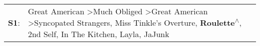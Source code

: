 \begin{supertabular}{p{0.03\textwidth}p{0.92\textwidth}}
 \textbf{S1}:  &  Great American\textsuperscript{} \textgreater \enspace Much Obliged\textsuperscript{} \textgreater \enspace Great American\textsuperscript{} \textgreater \enspace Syncopated Strangers\textsuperscript{}, \enspace Miss Tinkle's Overture\textsuperscript{}, \enspace \textbf{Roulette\textsuperscript{$\wedge$}}, \enspace 2nd Self\textsuperscript{}, \enspace In The Kitchen\textsuperscript{}, \enspace Layla\textsuperscript{}, \enspace JaJunk\textsuperscript{}  \enspace  \\
\end{supertabular}
